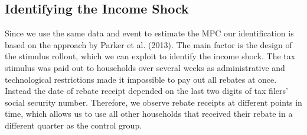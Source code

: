 \subsection{Identifying the Income Shock} \label{subsec:identification}
Since we use the same data and event to estimate the MPC our identification is based on the approach by Parker et al. (2013). The main factor is the design of the stimulus rollout, which we can exploit to identify the income shock. The tax stimulus was paid out to households over several weeks as administrative and technological restrictions made it impossible to pay out all rebates at once. Instead the date of rebate receipt depended on the last two digits of tax filers' social security number. Therefore, we observe rebate receipts at different points in time, which allows us to use all other households that received their rebate in a different quarter as the control group. \\
